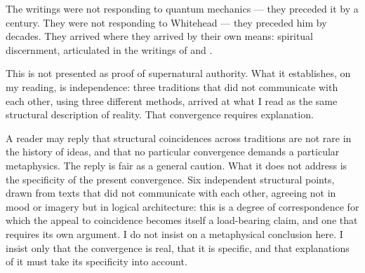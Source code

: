 The \bahai writings were not responding to quantum mechanics --- they
preceded it by a century.
They were not responding to Whitehead --- they preceded him by decades.
They arrived where they arrived by their own means: spiritual discernment,
articulated in the writings of \Bahaullah and \AbdulBaha.

This is not presented as proof of supernatural authority.
What it establishes, on my reading, is independence: three traditions that did not communicate
with each other, using three different methods, arrived at what I read as the same structural
description of reality.
That convergence requires explanation.

A reader may reply that structural coincidences across traditions are not rare
in the history of ideas, and that no particular convergence demands a
particular metaphysics.
The reply is fair as a general caution.
What it does not address is the specificity of the present convergence.
Six independent structural points, drawn from texts that did not communicate
with each other, agreeing not in mood or imagery but in logical architecture:
this is a degree of correspondence for which the appeal to coincidence
becomes itself a load-bearing claim, and one that requires its own argument.
I do not insist on a metaphysical conclusion here.
I insist only that the convergence is real, that it is specific, and that
explanations of it must take its specificity into account.
